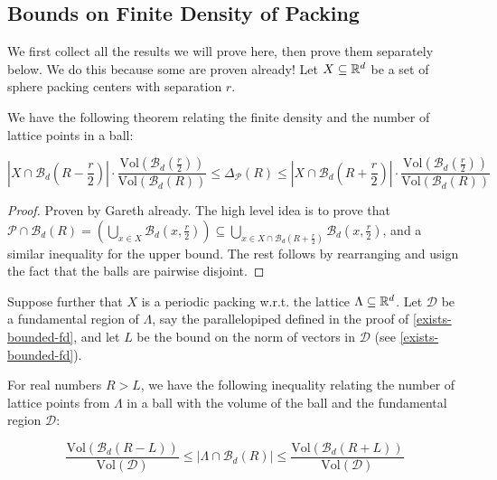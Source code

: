 \subsection{Bounds on Finite Density of Packing}

We first collect all the results we will prove here, then prove them separately below. We do this because some are proven already! Let $X \subseteq \mathbb{R}^d$ be a set of sphere packing centers with separation $r$.

\begin{theorem}\label{finite-density-bounds}\uses{}\leanok
  We have the following theorem relating the finite density and the number of lattice points in a ball:

  \[
    \left|X \cap \mathcal{B}_d\left(R - \frac{r}{2}\right)\right| \cdot \frac{\mathrm{Vol}\left(\mathcal{B}_d\left(\frac{r}{2}\right)\right)}{\mathrm{Vol}(\mathcal{B}_d(R))}
    \leq \Delta_{\mathcal{P}}(R)
    \leq \left|X \cap \mathcal{B}_d\left(R + \frac{r}{2}\right)\right| \cdot \frac{\mathrm{Vol}\left(\mathcal{B}_d\left(\frac{r}{2}\right)\right)}{\mathrm{Vol}(\mathcal{B}_d(R))}
  \]
\end{theorem}
\begin{proof}
  Proven by Gareth already. The high level idea is to prove that $\mathcal{P} \cap \mathcal{B}_d(R) = \left(\bigcup_{x \in X} \mathcal{B}_d\left(x, \frac{r}{2}\right)\right) \subseteq \bigcup_{x \in X \cap \mathcal{B}_d\left(R + \frac{r}{2}\right)} \mathcal{B}_d\left(x, \frac{r}{2}\right)$, and a similar inequality for the upper bound. The rest follows by rearranging and usign the fact that the balls are pairwise disjoint.
\end{proof}

Suppose further that $X$ is a periodic packing w.r.t. the lattice $\Lambda \subseteq \mathbb{R}^d$. Let $\mathcal{D}$ be a fundamental region of $\Lambda$, say the parallelopiped defined in the proof of \cref{exists-bounded-fd}, and let $L$ be the bound on the norm of vectors in $\mathcal{D}$ (see \cref{exists-bounded-fd}).

\begin{theorem}\label{lattice-points-bounds}
  For real numbers $R > L$, we have the following inequality relating the number of lattice points from $\Lambda$ in a ball with the volume of the ball and the fundamental region $\mathcal{D}$:

  \[
    \frac{\mathrm{Vol}(\mathcal{B}_d(R - L))}{\mathrm{Vol}(\mathcal{D})}
    \leq \left|\Lambda \cap \mathcal{B}_d(R)\right|
    \leq \frac{\mathrm{Vol}(\mathcal{B}_d(R + L))}{\mathrm{Vol}(\mathcal{D})}
  \]
\end{theorem}

